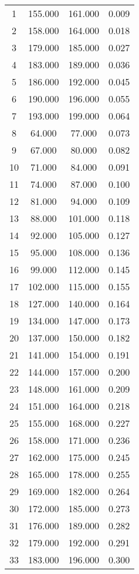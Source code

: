 % 
\begin{tabular}{cccc}
  \hline
  \hline
1 & 155.000 & 161.000 & 0.009 \\ 
  2 & 158.000 & 164.000 & 0.018 \\ 
  3 & 179.000 & 185.000 & 0.027 \\ 
  4 & 183.000 & 189.000 & 0.036 \\ 
  5 & 186.000 & 192.000 & 0.045 \\ 
  6 & 190.000 & 196.000 & 0.055 \\ 
  7 & 193.000 & 199.000 & 0.064 \\ 
  8 & 64.000 & 77.000 & 0.073 \\ 
  9 & 67.000 & 80.000 & 0.082 \\ 
  10 & 71.000 & 84.000 & 0.091 \\ 
  11 & 74.000 & 87.000 & 0.100 \\ 
  12 & 81.000 & 94.000 & 0.109 \\ 
  13 & 88.000 & 101.000 & 0.118 \\ 
  14 & 92.000 & 105.000 & 0.127 \\ 
  15 & 95.000 & 108.000 & 0.136 \\ 
  16 & 99.000 & 112.000 & 0.145 \\ 
  17 & 102.000 & 115.000 & 0.155 \\ 
  18 & 127.000 & 140.000 & 0.164 \\ 
  19 & 134.000 & 147.000 & 0.173 \\ 
  20 & 137.000 & 150.000 & 0.182 \\ 
  21 & 141.000 & 154.000 & 0.191 \\ 
  22 & 144.000 & 157.000 & 0.200 \\ 
  23 & 148.000 & 161.000 & 0.209 \\ 
  24 & 151.000 & 164.000 & 0.218 \\ 
  25 & 155.000 & 168.000 & 0.227 \\ 
  26 & 158.000 & 171.000 & 0.236 \\ 
  27 & 162.000 & 175.000 & 0.245 \\ 
  28 & 165.000 & 178.000 & 0.255 \\ 
  29 & 169.000 & 182.000 & 0.264 \\ 
  30 & 172.000 & 185.000 & 0.273 \\ 
  31 & 176.000 & 189.000 & 0.282 \\ 
  32 & 179.000 & 192.000 & 0.291 \\ 
  33 & 183.000 & 196.000 & 0.300 \\ 

\end{tabular}
